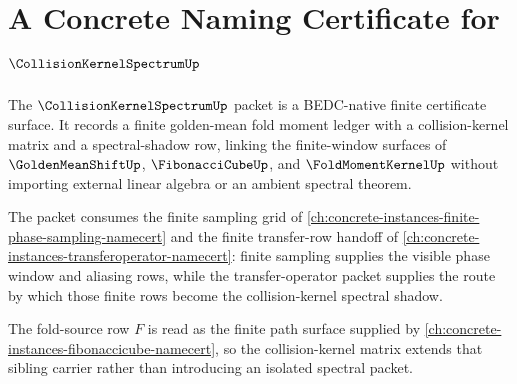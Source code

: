\chapter{A Concrete Naming Certificate for $\CollisionKernelSpectrumUp$}
\label{ch:concrete-instances-collisionkernelspectrum-namecert}

The $\CollisionKernelSpectrumUp$ packet is a BEDC-native finite certificate surface. It records a finite golden-mean fold moment ledger with a collision-kernel matrix and a spectral-shadow row, linking the finite-window surfaces of $\GoldenMeanShiftUp$, $\FibonacciCubeUp$, and $\FoldMomentKernelUp$ without importing external linear algebra or an ambient spectral theorem.

The packet consumes the finite sampling grid of \autoref{ch:concrete-instances-finite-phase-sampling-namecert} and the finite transfer-row handoff of \autoref{ch:concrete-instances-transferoperator-namecert}: finite sampling supplies the visible phase window and aliasing rows, while the transfer-operator packet supplies the route by which those finite rows become the collision-kernel spectral shadow.

The fold-source row $F$ is read as the finite path surface supplied by \autoref{ch:concrete-instances-fibonaccicube-namecert}, so the collision-kernel matrix extends that sibling carrier rather than introducing an isolated spectral packet.

